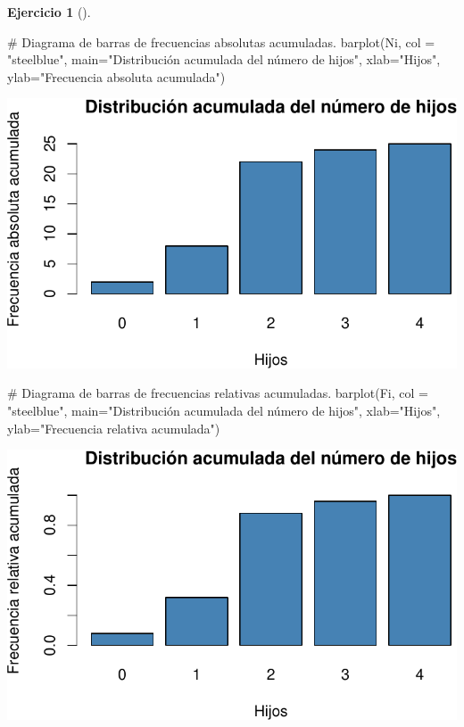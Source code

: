 \documentclass[
  a4paper,
]{scrreport}
\newenvironment{Shaded}{\begin{snugshade}}{\end{snugshade}}
\newcommand{\AttributeTok}[1]{\textcolor[rgb]{0.40,0.45,0.13}{#1}}
\newcommand{\CommentTok}[1]{\textcolor[rgb]{0.37,0.37,0.37}{#1}}
\newcommand{\FunctionTok}[1]{\textcolor[rgb]{0.28,0.35,0.67}{#1}}
\newcommand{\NormalTok}[1]{\textcolor[rgb]{0.00,0.23,0.31}{#1}}
\newcommand{\StringTok}[1]{\textcolor[rgb]{0.13,0.47,0.30}{#1}}
\theoremstyle{definition}
\newtheorem{exercise}{Ejercicio}[chapter]
\theoremstyle{remark}
\begin{document}
\begin{exercise}[]
\begin{enumerate}
\begin{tcolorbox}
\begin{Shaded}
\begin{Highlighting}[]
\CommentTok{\# Diagrama de barras de frecuencias absolutas acumuladas.}
\FunctionTok{barplot}\NormalTok{(Ni, }\AttributeTok{col =} \StringTok{"steelblue"}\NormalTok{, }\AttributeTok{main=}\StringTok{"Distribución acumulada del número de hijos"}\NormalTok{, }\AttributeTok{xlab=}\StringTok{"Hijos"}\NormalTok{, }\AttributeTok{ylab=}\StringTok{"Frecuencia absoluta acumulada"}\NormalTok{)}
\end{Highlighting}
\end{Shaded}

  \includegraphics{03-frecuencias-graficos_files/figure-pdf/unnamed-chunk-6-3.pdf}

\begin{Shaded}
\begin{Highlighting}[]
\CommentTok{\# Diagrama de barras de frecuencias relativas acumuladas.}
\FunctionTok{barplot}\NormalTok{(Fi, }\AttributeTok{col =} \StringTok{"steelblue"}\NormalTok{, }\AttributeTok{main=}\StringTok{"Distribución acumulada del número de hijos"}\NormalTok{, }\AttributeTok{xlab=}\StringTok{"Hijos"}\NormalTok{, }\AttributeTok{ylab=}\StringTok{"Frecuencia relativa acumulada"}\NormalTok{)}
\end{Highlighting}
\end{Shaded}

  \includegraphics{03-frecuencias-graficos_files/figure-pdf/unnamed-chunk-6-4.pdf}


\end{tcolorbox}
\end{enumerate}
\end{exercise}
\end{document}
